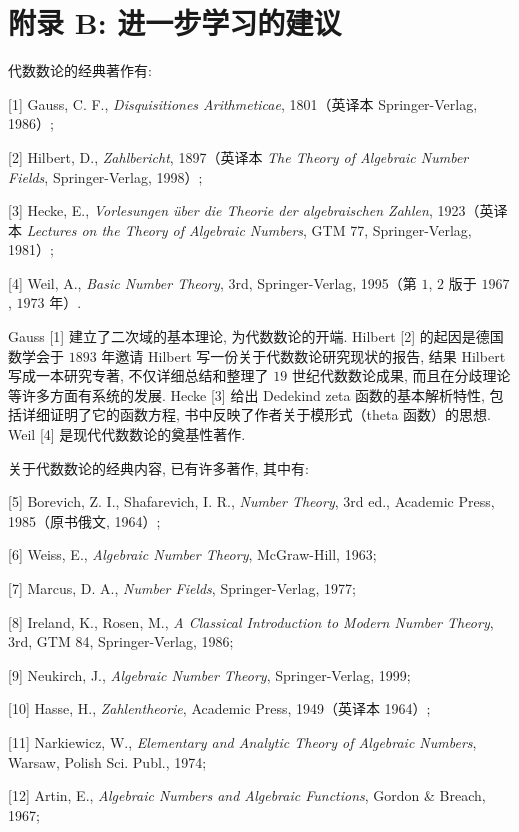 \chapter*{附录 B: 进一步学习的建议}

代数数论的经典著作有:

[1] Gauss, C. F., \emph{Disquisitiones Arithmeticae}, 1801（英译本 Springer-Verlag, 1986）;

[2] Hilbert, D., \emph{Zahlbericht}, 1897（英译本 \emph{The Theory of Algebraic Number Fields}, Springer-Verlag, 1998）;

[3] Hecke, E., \emph{Vorlesungen \"uber die Theorie der algebraischen Zahlen}, 1923（英译本 \emph{Lectures on the Theory of Algebraic Numbers}, GTM 77, Springer-Verlag, 1981）;

[4] Weil, A., \emph{Basic Number Theory}, 3rd, Springer-Verlag, 1995（第 $1$, $2$ 版于 $1967$, $1973$ 年）.

Gauss [1] 建立了二次域的基本理论, 为代数数论的开端. Hilbert [2] 的起因是德国数学会于 $1893$ 年邀请 Hilbert 写一份关于代数数论研究现状的报告, 结果 Hilbert 写成一本研究专著, 不仅详细总结和整理了 $19$ 世纪代数数论成果, 而且在分歧理论等许多方面有系统的发展. Hecke [3] 给出 Dedekind zeta 函数的基本解析特性, 包括详细证明了它的函数方程, 书中反映了作者关于模形式（theta 函数）的思想. Weil [4] 是现代代数数论的奠基性著作.

关于代数数论的经典内容, 已有许多著作, 其中有:

[5] Borevich, Z. I., Shafarevich, I. R., \emph{Number Theory}, 3rd ed., Academic Press, 1985（原书俄文, 1964）;

[6] Weiss, E., \emph{Algebraic Number Theory}, McGraw-Hill, 1963;

[7] Marcus, D. A., \emph{Number Fields}, Springer-Verlag, 1977;

[8] Ireland, K., Rosen, M., \emph{A Classical Introduction to Modern Number Theory}, 3rd, GTM 84, Springer-Verlag, 1986;

[9] Neukirch, J., \emph{Algebraic Number Theory}, Springer-Verlag, 1999;

[10] Hasse, H., \emph{Zahlentheorie}, Academic Press, 1949（英译本 1964）;

[11] Narkiewicz, W., \emph{Elementary and Analytic Theory of Algebraic Numbers}, Warsaw, Polish Sci. Publ., 1974;

[12] Artin, E., \emph{Algebraic Numbers and Algebraic Functions}, Gordon \& Breach, 1967;

